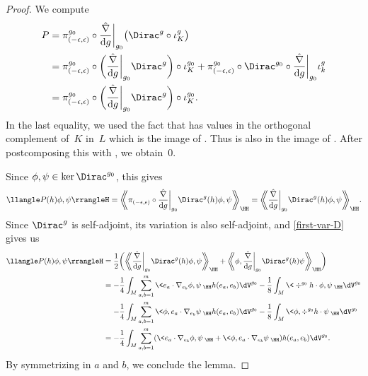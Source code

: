 \begin{proof}
We compute
\begin{align*}
P
& = \pi_{(-\epsilon,\epsilon)}^{g_0} \circ \frac{\hat\nabla}{{\rm d}g}\bigg|_{g_0} \bigl(\Dirac^g \circ \iota_K^g \bigr)\\
&= \pi_{(-\epsilon,\epsilon)}^{g_0} \circ \biggl(\frac{\hat\nabla}{{\rm d}g}\bigg|_{g_0} \Dirac^g\biggr)\circ\iota_K^{g_0}
+ \pi_{(-\epsilon,\epsilon)}^{g_0} \circ \Dirac^{g_0}\circ\frac{\hat\nabla}{{\rm d}g}\bigg|_{g_0}\iota_k^g\\
&= \pi_{(-\epsilon,\epsilon)}^{g_0} \circ\biggl(\frac{\hat\nabla}{{\rm d}g}\bigg|_{g_0} \Dirac^g\biggr)\circ\iota_K^{g_0} .
\end{align*}
In the last equality, we used the fact that  has values in the orthogonal complement of~$K$ in~$L$ which is the image of \smash{$\pi_{(-\infty,-\epsilon]\cup [\epsilon,\infty)}^{g_0}$}.
Thus  is also in the image of \smash{$\pi_{(-\infty,-\epsilon]\cup [\epsilon,\infty)}^{g_0}$}. After postcomposing this with , we obtain~$0$.

Since $\phi,\psi \in \ker \Dirac^{g_0}$, this gives
\[
\llangle P(h)\phi,\psi\rrangleH
=
\biggl\langle\!\!\!\biggl\langle \pi_{(-\epsilon,\epsilon)}\circ\frac{\hat\nabla}{{\rm d}g}\bigg|_{g_0} \Dirac^g(h)\phi,\psi\biggr\rangle\!\!\!\biggr\rangle_\HH
=
\biggl\langle\!\!\!\biggl\langle \frac{\hat\nabla}{{\rm d}g}\bigg|_{g_0} \Dirac^g(h) \phi,\psi\biggr\rangle\!\!\!\biggr\rangle_\HH .
\]
Since $\Dirac^g$ is self-adjoint, its variation is also self-adjoint, and \eqref{first-var-D} gives us
\[ \begin{split}
\llangle P(h)\phi,\psi\rrangleH
={}&
\frac{1}{2} \biggl(
\biggl\langle\!\!\!\biggl\langle \frac{\hat\nabla}{{\rm d}g}\bigg|_{g_0} \Dirac^g(h) \phi,\psi\biggr\rangle\!\!\!\biggr\rangle_\HH
+ \biggl\langle\!\!\!\biggl\langle \phi, \frac{\hat\nabla}{{\rm d}g}\bigg|_{g_0} \Dirac^g(h) \psi\biggr\rangle\!\!\!\biggr\rangle_\HH
\biggr) \\
={}&
{-}\frac{1}{4} \int_M \sum_{a,b=1}^m \< e_a \cdot \nabla_{e_b} \phi,\psi \>_\HH h(e_a,e_b) \dV^{g_0}
-\frac{1}{8} \int_M \< \div^{g_0} h \cdot \phi,\psi \>_\HH \dV^{g_0} \\
&
{-}\frac{1}{4} \int_M \sum_{a,b=1}^m \< \phi,e_a \cdot \nabla_{e_b} \psi \>_\HH h(e_a,e_b) \dV^{g_0}
-\frac{1}{8} \int_M \< \phi,\div^{g_0} h \cdot \psi \>_\HH \dV^{g_0} \\
={}&
{-}\frac{1}{4} \int_M \sum_{a,b=1}^m ( \< e_a \cdot \nabla_{e_b} \phi,\psi \>_\HH
+ \< \phi, e_a \cdot \nabla_{e_b}\psi \>_\HH ) h(e_a,e_b) \dV^{g_0} .
\end{split} \]
By symmetrizing in $a$ and $b$, we conclude the lemma.
\end{proof}

